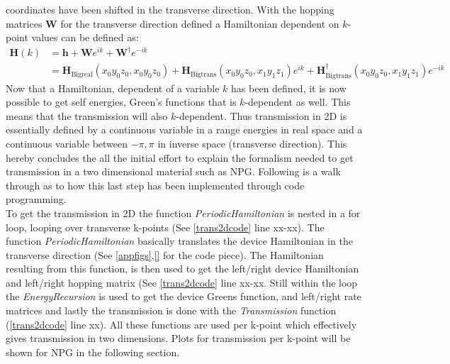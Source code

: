 coordinates have been shifted in the transverse direction. With the hopping matrices \(\mathbf{W}\) for the transverse direction defined a Hamiltonian dependent on \(k\)-point values can be defined as:\begin{align}
    \textbf{H}(k) &= \textbf{h}+\textbf{W}e^{ik}+\textbf{W}^{\dagger}e^{-ik}\\
    &= \textbf{H}_{\text{Bigreal}}(x_0y_0z_0,x_0y_0z_0) + \textbf{H}_{\text{Bigtrans}}(x_0y_0z_0,x_1y_1z_1)e^{ik}+\textbf{H}_{\text{Bigtrans}}^{\dagger}(x_0y_0z_0,x_1y_1z_1)e^{-ik}
\end{align}
Now that a Hamiltonian, dependent of a variable \(k\) has been defined, it is now possible to get self energies, Green's functions that is \(k\)-dependent as well. This means that the transmission will also \(k\)-dependent. Thus transmission in 2D is essentially defined by a continuous variable in a range energies in real space and a continuous variable between \(-\pi,\pi\) in inverse space (transverse direction). This hereby concludes the all the initial effort to explain the formalism needed to get transmission in a two dimensional material such as NPG. Following is a walk through as to how this last step has been implemented through code programming.\\
To get the transmission in 2D the function \textit{PeriodicHamiltonian} is nested in a for loop, looping over transverse k-points (See \cref{trans2dcode} line xx-xx). The function \textit{PeriodicHamiltonian} basically translates the device Hamiltonian in the transverse direction (See \cref{appfigs},\cref{} for the code piece). The Hamiltonian resulting from this function, is then used to get the left/right device Hamiltonian and left/right hopping matrix (See \cref{trans2dcode} line xx-xx. Still within the loop the \textit{EnergyRecursion} is used to get the device Greens function, and left/right rate matrices and lastly the transmission is done with the \textit{Transmission} function (\cref{trans2dcode} line xx). All these functions are used per k-point which effectively gives transmission in two dimensions.
\vspace{-1\baselineskip}
\vspace{\baselineskip}
Plots for transmission per k-point will be shown for NPG in the following section. 
